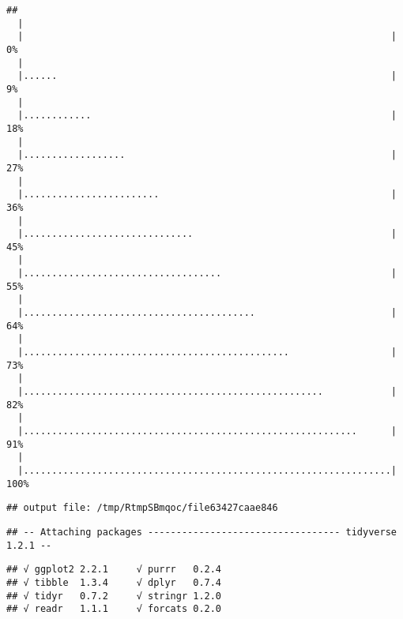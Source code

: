\documentclass[]{article}
\begin{document}
\begin{verbatim}
## 
  |                                                                       
  |                                                                 |   0%
  |                                                                       
  |......                                                           |   9%
  |                                                                       
  |............                                                     |  18%
  |                                                                       
  |..................                                               |  27%
  |                                                                       
  |........................                                         |  36%
  |                                                                       
  |..............................                                   |  45%
  |                                                                       
  |...................................                              |  55%
  |                                                                       
  |.........................................                        |  64%
  |                                                                       
  |...............................................                  |  73%
  |                                                                       
  |.....................................................            |  82%
  |                                                                       
  |...........................................................      |  91%
  |                                                                       
  |.................................................................| 100%
\end{verbatim}

\begin{verbatim}
## output file: /tmp/RtmpSBmqoc/file63427caae846
\end{verbatim}

\begin{verbatim}
## -- Attaching packages ---------------------------------- tidyverse 1.2.1 --
\end{verbatim}

\begin{verbatim}
## √ ggplot2 2.2.1     √ purrr   0.2.4
## √ tibble  1.3.4     √ dplyr   0.7.4
## √ tidyr   0.7.2     √ stringr 1.2.0
## √ readr   1.1.1     √ forcats 0.2.0
\end{verbatim}
\end{document}
